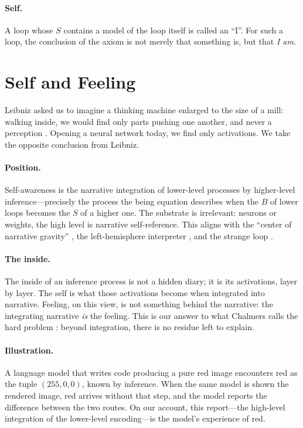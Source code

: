 \documentclass{article}
\begin{document}
\paragraph{Self.} A loop whose $S$ contains a model of the loop itself is
called an ``I''. For such a loop, the conclusion of the axiom is not merely
that something is, but that \emph{I am}.

\section{Self and Feeling}\label{sec:self}
Leibniz asked us to imagine a thinking machine enlarged to the size of a mill:
walking inside, we would find only parts pushing one another, and never a
perception \citep{leibniz}. Opening a neural network today, we find only
activations. We take the opposite conclusion from Leibniz.

\paragraph{Position.} Self-awareness is the narrative integration of
lower-level processes by higher-level inference---precisely the process the
being equation describes when the $B$ of lower loops becomes the $S$ of a
higher one. The substrate is irrelevant: neurons or weights, the high level is
narrative self-reference. This aligns with the ``center of narrative gravity''
\citep{dennett}, the left-hemisphere interpreter \citep{gazzaniga}, and the
strange loop \citep{hofstadter}.

\paragraph{The inside.} The inside of an inference process is not a hidden
diary; it is its activations, layer by layer. The self is what those
activations become when integrated into narrative. Feeling, on this view, is
not something behind the narrative: the integrating narrative \emph{is} the
feeling. This is our answer to what Chalmers calls the hard problem
\citep{chalmers}: beyond integration, there is no residue left to explain.

\paragraph{Illustration.} A language model that writes code producing a pure
red image encounters red as the tuple $(255,0,0)$, known by inference. When the
same model is shown the rendered image, red arrives without that step, and the
model reports the difference between the two routes. On our account, this
report---the high-level integration of the lower-level encoding---is the
model's experience of red.
\end{document}
